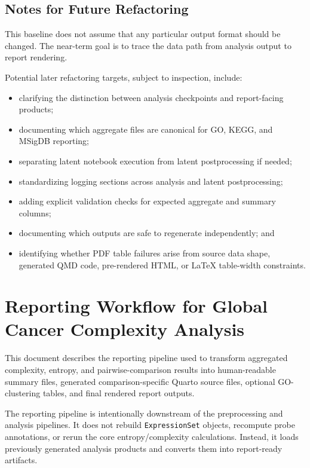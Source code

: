 \documentclass[
  letterpaper,
  DIV=11,
  numbers=noendperiod,
  openany,
  oneside]{scrreprt}
\providecommand{\tightlist}{%
  \setlength{\itemsep}{0pt}\setlength{\parskip}{0pt}}
\begin{document}
\section*{Notes for Future
Refactoring}\label{notes-for-future-refactoring}


This baseline does not assume that any particular output format should
be changed. The near-term goal is to trace the data path from analysis
output to report rendering.

Potential later refactoring targets, subject to inspection, include:

\begin{itemize}
\tightlist
\item
  clarifying the distinction between analysis checkpoints and
  report-facing products;
\item
  documenting which aggregate files are canonical for GO, KEGG, and
  MSigDB reporting;
\item
  separating latent notebook execution from latent postprocessing if
  needed;
\item
  standardizing logging sections across analysis and latent
  postprocessing;
\item
  adding explicit validation checks for expected aggregate and summary
  columns;
\item
  documenting which outputs are safe to regenerate independently; and
\item
  identifying whether PDF table failures arise from source data shape,
  generated QMD code, pre-rendered HTML, or LaTeX table-width
  constraints.
\end{itemize}

\chapter{Reporting Workflow for Global Cancer Complexity
Analysis}\label{reporting-workflow-for-global-cancer-complexity-analysis}

This document describes the reporting pipeline used to transform
aggregated complexity, entropy, and pairwise-comparison results into
human-readable summary files, generated comparison-specific Quarto
source files, optional GO-clustering tables, and final rendered report
outputs.

The reporting pipeline is intentionally downstream of the preprocessing
and analysis pipelines. It does not rebuild \texttt{ExpressionSet}
objects, recompute probe annotations, or rerun the core
entropy/complexity calculations. Instead, it loads previously generated
analysis products and converts them into report-ready artifacts.
\end{document}

